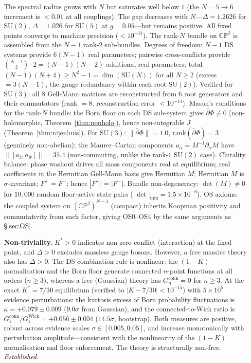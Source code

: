 \documentclass[11pt,a4paper]{article}
\theoremstyle{definition}
\theoremstyle{remark}
\newcommand{\CP}{\mathbb{CP}}
\newcommand{\dbar}{\bar{\partial}}
\newcommand{\SU}{\mathrm{SU}}
\begin{document}
The spectral radius grows with $N$ but saturates well below $1$ (the $N=5\to 6$ increment is $<0.01$ at all couplings). The gap decreases with $N$---$\Delta=1.2626$ for $\SU(2)$, $\Delta=1.026$ for $\SU(5)$ at $g=0.05$---but remains positive. All fixed points converge to machine precision ($<10^{-14}$). The rank-$N$ bundle on $\CP^3$ is assembled from the $N-1$ rank-2 sub-bundles. Degrees of freedom: $N-1$ DS systems provide $6(N-1)$ real parameters; pairwise cross-conflicts provide $\binom{N-1}{2}\cdot 2=(N-1)(N-2)$ additional real parameters; total $(N-1)(N+4)\geq N^2-1=\dim(\SU(N))$ for all $N\geq 2$ (excess $=3(N-1)$, the gauge redundancy within each root $\SU(2)$). Verified for $\SU(3)$: all 8 Gell-Mann matrices are reconstructed from 6 root generators and their commutators (rank $=8$, reconstruction error $<10^{-14}$). Mason's conditions for the rank-$N$ bundle: the Born floor on each DS sub-system gives $\dbar\Phi\neq 0$ (non-holomorphic, Theorem~\ref{thm:nonholo}), hence non-integrable $J$ (Theorem~\ref{thm:nijenhuis}). For $\SU(3)$: $\|\dbar\Phi\|=1.0$, $\mathrm{rank}(\dbar\Phi)=3$ (genuinely non-abelian); the Maurer--Cartan components $a_{\bar\alpha}=M^{-1}\dbar_\alpha M$ have $\|[a_{\bar z},a_{\bar w}]\|=35.4$ (non-commuting, unlike the rank-$1$ $\SU(2)$ case). Chirality balance: phase washout drives all mass components real at equilibrium; real coefficients in the Hermitian Gell-Mann basis give Hermitian $M$; Hermitian $M$ is $\sigma$-invariant; $F^+=\overline{F^-}$; hence $|F^+|=|F^-|$. Bundle non-degeneracy: $\det(M)\neq 0$ for $10{,}000$ random floor-active state pairs ($|\det|_{\min}=1.5\times 10^{-6}$). OS axioms: the coupled system on $(\CP^3)^{N-1}$ (compact) inherits Koopman positivity and commutativity from each factor, giving OS0--OS4 by the same arguments as \S\ref{sec:OS}.

\textbf{Non-triviality.} $K^*>0$ indicates non-zero conflict (interaction) at the fixed point, and $\Delta>0$ excludes massless gauge bosons. However, a free massive theory also has $\Delta>0$. The DS combination rule is nonlinear: the $(1-K)$ normalisation and the Born floor generate connected $n$-point functions at all orders ($n\geq 3$), whereas a free (Gaussian) theory has $G_n^{\mathrm{conn}}=0$ for $n\geq 3$. At the exact $K^*=7/30$ equilibrium (verified to $|K-7/30|<10^{-15}$) with $5\times 10^5$ evidence perturbations: the kurtosis excess of Born probability fluctuations is $\kappa=+0.079\pm 0.009$ ($9.0\sigma$ from Gaussian), and the connected-to-Wick ratio is $G_4^{\mathrm{conn}}/G_4^{\mathrm{Wick}}=+0.056\pm 0.004$ ($14.5\sigma$, bootstrap). Both measures are positive, robust across evidence scales $\sigma\in[0.005,0.05]$, and increase monotonically with perturbation amplitude---consistent with the nonlinearity of the $(1-K)$ normalisation and floor enforcement. The theory is structurally non-free. \emph{Established.}
\end{document}
